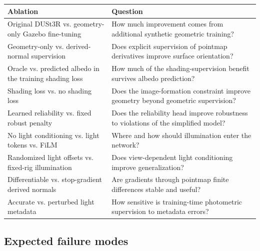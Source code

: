 \documentclass[11pt,a4paper]{article}
\begin{document}
\begin{center}
\begin{tabularx}{\textwidth}{>{\raggedright\arraybackslash}p{}X}
\toprule
Ablation & Question\\
\midrule
Original DUSt3R vs. geometry-only Gazebo fine-tuning &
How much improvement comes from additional synthetic geometric training?\\
Geometry-only vs. derived-normal supervision &
Does explicit supervision of pointmap derivatives improve surface orientation?\\
Oracle vs. predicted albedo in the training shading loss &
How much of the shading-supervision benefit survives albedo prediction?\\
Shading loss vs. no shading loss &
Does the image-formation constraint improve geometry beyond geometric supervision?\\
Learned reliability vs. fixed robust penalty &
Does the reliability head improve robustness to violations of the simplified model?\\
No light conditioning vs. light tokens vs. FiLM &
Where and how should illumination enter the network?\\
Randomized light offsets vs. fixed-rig illumination &
Does view-dependent light conditioning improve generalization?\\
Differentiable vs. stop-gradient derived normals &
Are gradients through pointmap finite differences stable and useful?\\
Accurate vs. perturbed light metadata &
How sensitive is training-time photometric supervision to metadata errors?\\
\bottomrule
\end{tabularx}
\end{center}

\subsection{Expected failure modes}
\end{document}
